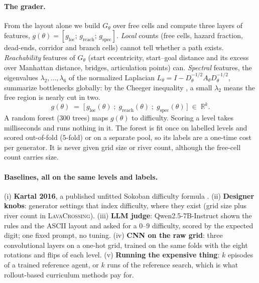 \documentclass[twoside]{article}
\newcommand{\R}{\mathbb{R}}
\begin{document}
\paragraph{The grader.}
\label{sec:geometric-descriptors}
From the layout alone we build $G_\theta$ over free cells and compute three layers of features, $g(\theta) = [g_{\mathrm{loc}};\, g_{\mathrm{reach}};\, g_{\mathrm{spec}}]$. \emph{Local} counts (free cells, hazard fraction, dead-ends, corridor and branch cells) cannot tell whether a path exists. \emph{Reachability} features of $G_\theta$ (start eccentricity, start--goal distance and its excess over Manhattan distance, bridges, articulation points) can. \emph{Spectral} features, the eigenvalues $\lambda_2,\ldots,\lambda_6$ of the normalized Laplacian $L_\theta = I - D_\theta^{-1/2}A_\theta D_\theta^{-1/2}$, summarize bottlenecks globally: by the Cheeger inequality \citep{chung1997spectral}, a small $\lambda_2$ means the free region is nearly cut in two.
\begin{equation}
    g(\theta) \;=\; \big[\, g_{\mathrm{loc}}(\theta) \;;\; g_{\mathrm{reach}}(\theta) \;;\; g_{\mathrm{spec}}(\theta) \,\big] \;\in\; \R^{k}.
\label{eq:full-descriptor}
\end{equation}
A random forest ($300$ trees) maps $g(\theta)$ to difficulty. Scoring a level takes milliseconds and runs nothing in it. The forest is fit once on labelled levels and scored out-of-fold ($5$-fold) or on a separate pool, so its labels are a one-time cost per generator. It is never given grid size or river count, although the free-cell count carries size.

\paragraph{Baselines, all on the same levels and labels.} (i) \textbf{Kartal 2016}, a published unfitted Sokoban difficulty formula \citep{kartal2016data}. (ii) \textbf{Designer knobs}: generator settings that index difficulty, where they exist (grid size plus river count in \textsc{LavaCrossing}). (iii) \textbf{LLM judge}: Qwen2.5-7B-Instruct \citep{hui2024qwen2} shown the rules and the ASCII layout and asked for a $0$--$9$ difficulty, scored by the expected digit; one fixed prompt, no tuning. (iv) \textbf{CNN on the raw grid}: three convolutional layers on a one-hot grid, trained on the same folds with the eight rotations and flips of each level. (v) \textbf{Running the expensive thing}: $k$ episodes of a trained reference agent, or $k$ runs of the reference search, which is what rollout-based curriculum methods pay for.
\end{document}
